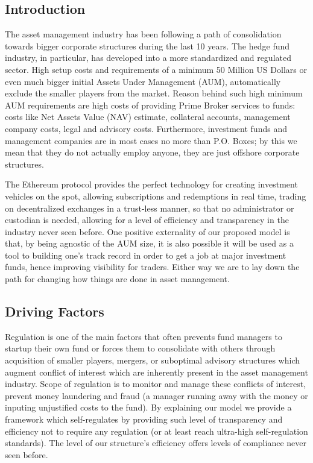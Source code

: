 \documentclass[9pt,oneside]{amsart}
\begin{document}
\setlength{\columnsep}{20pt}
\begin{multicols}{2}

\section{Introduction}\label{sec:introduction}

The asset management industry has been following a path of consolidation towards bigger corporate structures during the last 10 years. The hedge fund industry, in particular, has developed into a more standardized and regulated sector. High setup costs and requirements of a minimum 50 Million US Dollars or even much bigger initial Assets Under Management (AUM), automatically exclude the smaller players from the market. Reason behind such high minimum AUM requirements are high costs of providing Prime Broker services to funds: costs like Net Assets Value (NAV) estimate, collateral accounts, management company costs, legal and advisory costs. Furthermore, investment funds and management companies are in most cases no more than P.O. Boxes; by this we mean that they do not actually employ anyone, they are just offshore corporate structures.

The Ethereum protocol provides the perfect technology for creating investment vehicles on the spot, allowing subscriptions and redemptions in real time, trading on decentralized exchanges in a trust-less manner, so that no administrator or custodian is needed, allowing for a level of efficiency and transparency in the industry never seen before. One positive externality of our proposed model is that, by being agnostic of the AUM size, it is also possible it will be used as a tool to building one's track record in order to get a job at major investment funds, hence improving visibility for traders. Either way we are to lay down the path for changing how things are done in asset management.

\subsection{Driving Factors} \label{ch:driving}

Regulation is one of the main factors that often prevents fund managers to startup their own fund or forces them to consolidate with others through acquisition of smaller players, mergers, or suboptimal advisory structures which augment conflict of interest which are inherently present in the asset management industry. Scope of regulation is to monitor and manage these conflicts of interest, prevent money laundering and fraud (a manager running away with the money or inputing unjustified costs to the fund). By explaining our model we provide a framework which self-regulates by providing such level of transparency and efficiency not to require any regulation (or at least reach ultra-high self-regulation standards). The level of our structure's efficiency offers levels of compliance never seen before.


\end{multicols}
\end{document}
